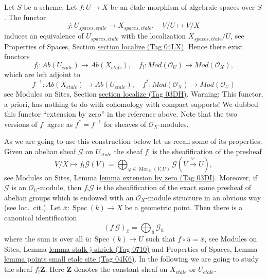 \documentclass{amsart}
\theoremstyle{plain}
\theoremstyle{definition}
\theoremstyle{remark}
\numberwithin{equation}{subsection}
\def\Spec{\mathop{\mathrm{Spec}}}
\def\Mor{\mathop{\mathrm{Mor}}\nolimits}
\def\etale{{\acute{e}tale}}
\begin{document}
\noindent
Let $S$ be a scheme. Let $f : U \to X$ be an \'etale morphism of algebraic
spaces over $S$. The functor
$$
j : U_{spaces, \etale} \longrightarrow X_{spaces, \etale},\quad
V/U \longmapsto V/X
$$
induces an equivalence of $U_{spaces, \etale}$ with the localization
$X_{spaces, \etale}/U$, see
Properties of Spaces, Section \href{https://stacks.math.columbia.edu/tag/04LX}{section localize (Tag 04LX)}.
Hence there exist functors
$$
f_! : \textit{Ab}(U_\etale) \longrightarrow
\textit{Ab}(X_\etale),\quad
f_! : \textit{Mod}(\mathcal{O}_U) \longrightarrow \textit{Mod}(\mathcal{O}_X),
$$
which are left adjoint to
$$
f^{-1} : \textit{Ab}(X_\etale) \longrightarrow
\textit{Ab}(U_\etale),\quad
f^* : \textit{Mod}(\mathcal{O}_X) \longrightarrow \textit{Mod}(\mathcal{O}_U)
$$
see
Modules on Sites, Section \href{https://stacks.math.columbia.edu/tag/03DH}{section localize (Tag 03DH)}.
Warning: This functor, a priori, has
nothing to do with cohomology with compact supports!
We dubbed this functor ``extension by zero'' in the reference above.
Note that the two versions of $f_!$ agree as $f^* = f^{-1}$ for
sheaves of $\mathcal{O}_X$-modules.

\medskip\noindent
As we are going to use this construction below let us recall some of its
properties. Given an abelian sheaf $\mathcal{G}$ on $U_\etale$
the sheaf $f_!$ is the sheafification of the presheaf
$$
V/X \longmapsto
f_!\mathcal{G}(V) =
\bigoplus\nolimits_{\varphi \in \Mor_X(V, U)}
\mathcal{G}(V \xrightarrow{\varphi} U),
$$
see
Modules on Sites, Lemma \href{https://stacks.math.columbia.edu/tag/03DI}{lemma extension by zero (Tag 03DI)}.
Moreover, if $\mathcal{G}$ is an $\mathcal{O}_U$-module, then $f_!\mathcal{G}$
is the sheafification of the exact same presheaf of abelian groups which
is endowed with an $\mathcal{O}_X$-module structure in an obvious way
(see loc.\ cit.). Let $\overline{x} : \Spec(k) \to X$
be a geometric point. Then there is a canonical identification
$$
(f_!\mathcal{G})_{\overline{x}} =
\bigoplus\nolimits_{\overline{u}} \mathcal{G}_{\overline{u}}
$$
where the sum is over all $\overline{u} : \Spec(k) \to U$ such that
$f \circ \overline{u} = \overline{x}$, see
Modules on Sites, Lemma \href{https://stacks.math.columbia.edu/tag/0710}{lemma stalk j shriek (Tag 0710)}
and
Properties of Spaces, Lemma
\href{https://stacks.math.columbia.edu/tag/04K6}{lemma points small etale site (Tag 04K6)}.
In the following we are going to study the sheaf $f_!\underline{\mathbf{Z}}$.
Here $\underline{\mathbf{Z}}$ denotes the constant sheaf on
$X_\etale$ or $U_\etale$.
\end{document}

